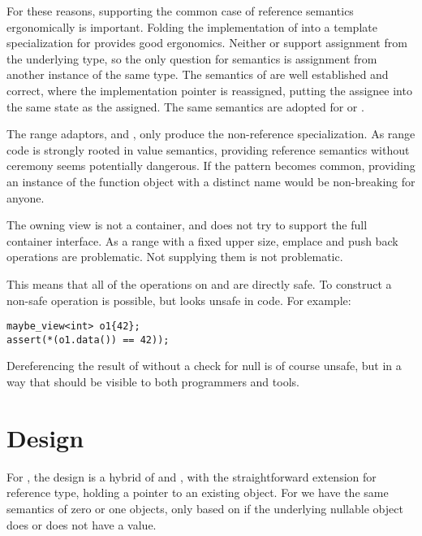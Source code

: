 \documentclass[a4paper,10pt,oneside,openany,final,article]{memoir}
\begin{document}
For these reasons, supporting the common case of reference semantics ergonomically is important. Folding the implementation of  into a template specialization for  provides good ergonomics. Neither  or  support assignment from the underlying type, so the only question for semantics is assignment from another instance of the same type. The semantics of  are well established and correct, where the implementation pointer is reassigned, putting the assignee into the same state as the assigned. The same semantics are adopted for  or .

The range adaptors,  and , only produce the non-reference specialization. As range code is strongly rooted in value semantics, providing reference semantics without ceremony seems potentially dangerous. If the pattern becomes common, providing an instance of the function object with a distinct name would be non-breaking for anyone.

The owning view  is not a container, and does not try to support the full container interface. As a range with a fixed upper size, emplace and push back operations are problematic. Not supplying them is not problematic.

This means that all of the operations on  and  are directly safe. To construct a non-safe operation is possible, but looks unsafe in code. For example:

\begin{minipage}[t]{\columnwidth}
  \begin{verbatim}
maybe_view<int> o1{42};
assert(*(o1.data()) == 42));
  \end{verbatim}
\end{minipage}

Dereferencing the result of  without a check for null is of course unsafe, but in a way that should be visible to both programmers and tools.

\chapter{Design}


For , the design is a hybrid of  and , with the straightforward extension for reference type, holding a pointer to an existing object. For  we have the same semantics of zero or one objects, only based on if the underlying nullable object does or does not have a value.
\end{document}
